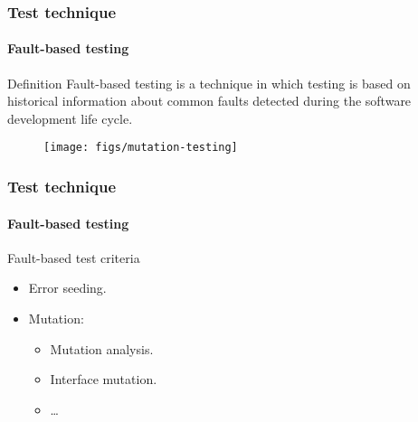 \begin{frame}
\frametitle{Test technique}
\framesubtitle{Fault-based testing}
\label{concept:fault-based-testing}

\begin{block:concept}{Definition}
Fault-based testing is a technique in which testing is based on
historical information about common faults detected during the software
development life cycle.
\end{block:concept}

\begin{figure}
    \centering
    \texttt{[image: figs/mutation-testing]}
\end{figure}
\end{frame}


\begin{frame}[hasprev=true, hasnext=false]
\frametitle{Test technique}
\framesubtitle{Fault-based testing}
\label{concept:fault-based-test-criteria}

\begin{block:fact}{Fault-based test criteria}
\begin{itemize}
	\item Error seeding.
	\item Mutation:
	\begin{itemize}
		\item Mutation analysis.
		\item Interface mutation.
		\item \ldots
	\end{itemize}
\end{itemize}
\end{block:fact}

\hfill
{}
\end{frame}
